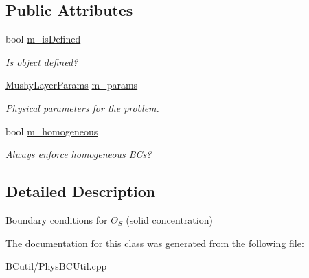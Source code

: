 \subsection*{Public Attributes}
\begin{DoxyCompactItemize}
\item 
\hypertarget{class_basic_theta_s_b_c_function_a64ef33fa1e5a0249b2b422cae7260ecc}{bool \hyperlink{class_basic_theta_s_b_c_function_a64ef33fa1e5a0249b2b422cae7260ecc}{m\-\_\-is\-Defined}}\label{class_basic_theta_s_b_c_function_a64ef33fa1e5a0249b2b422cae7260ecc}

\begin{DoxyCompactList}\small\item\em Is object defined? \end{DoxyCompactList}\item 
\hypertarget{class_basic_theta_s_b_c_function_a33aeec90e86ea72214cc98cfaba10c77}{\hyperlink{class_mushy_layer_params}{Mushy\-Layer\-Params} \hyperlink{class_basic_theta_s_b_c_function_a33aeec90e86ea72214cc98cfaba10c77}{m\-\_\-params}}\label{class_basic_theta_s_b_c_function_a33aeec90e86ea72214cc98cfaba10c77}

\begin{DoxyCompactList}\small\item\em Physical parameters for the problem. \end{DoxyCompactList}\item 
\hypertarget{class_basic_theta_s_b_c_function_a1ca3a3aefcb9b25f6896782b04767227}{bool \hyperlink{class_basic_theta_s_b_c_function_a1ca3a3aefcb9b25f6896782b04767227}{m\-\_\-homogeneous}}\label{class_basic_theta_s_b_c_function_a1ca3a3aefcb9b25f6896782b04767227}

\begin{DoxyCompactList}\small\item\em Always enforce homogeneous B\-Cs? \end{DoxyCompactList}\end{DoxyCompactItemize}


\subsection{Detailed Description}
Boundary conditions for $\Theta_S$ (solid concentration) 

The documentation for this class was generated from the following file\-:\begin{DoxyCompactItemize}
\item 
B\-Cutil/Phys\-B\-C\-Util.\-cpp\end{DoxyCompactItemize}
